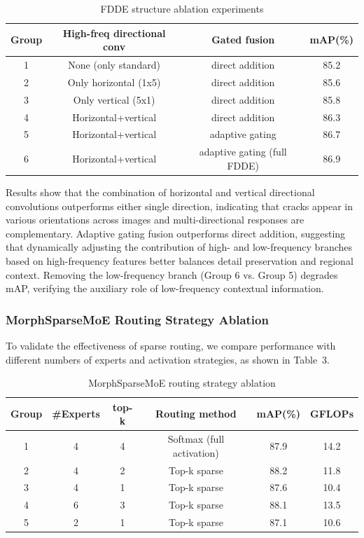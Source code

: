 \documentclass[twocolumn]{sn-jnl}
\begin{document}
	\begin{table}[htbp]
		\centering
		\caption{FDDE structure ablation experiments}
		\begin{tabular}{cccc}
			\toprule
			Group & High-freq directional conv & Gated fusion & mAP(\%) \\
			\midrule
			1 & None (only standard) & direct addition & 85.2 \\
			2 & Only horizontal (1x5) & direct addition & 85.6 \\
			3 & Only vertical (5x1) & direct addition & 85.8 \\
			4 & Horizontal+vertical & direct addition & 86.3 \\
			5 & Horizontal+vertical & adaptive gating & 86.7 \\
			6 & Horizontal+vertical & adaptive gating (full FDDE) & 86.9 \\
			\bottomrule
		\end{tabular}
		\label{tab:fdde}
	\end{table}
	
	Results show that the combination of horizontal and vertical directional convolutions outperforms either single direction, indicating that cracks appear in various orientations across images and multi-directional responses are complementary. Adaptive gating fusion outperforms direct addition, suggesting that dynamically adjusting the contribution of high- and low-frequency branches based on high-frequency features better balances detail preservation and regional context. Removing the low-frequency branch (Group 6 vs. Group 5) degrades mAP, verifying the auxiliary role of low-frequency contextual information.
	
	\subsubsection{MorphSparseMoE Routing Strategy Ablation}
	To validate the effectiveness of sparse routing, we compare performance with different numbers of experts and activation strategies, as shown in Table~3.
	
	\begin{table}[htbp]
		\centering
		\caption{MorphSparseMoE routing strategy ablation}
		\begin{tabular}{cccccc}
			\toprule
			Group & \#Experts & top-k & Routing method & mAP(\%) & GFLOPs \\
			\midrule
			1 & 4 & 4 & Softmax (full activation) & 87.9 & 14.2 \\
			2 & 4 & 2 & Top-k sparse & 88.2 & 11.8 \\
			3 & 4 & 1 & Top-k sparse & 87.6 & 10.4 \\
			4 & 6 & 3 & Top-k sparse & 88.1 & 13.5 \\
			5 & 2 & 1 & Top-k sparse & 87.1 & 10.6 \\
			\bottomrule
		\end{tabular}
		\label{tab:moe}
	\end{table}
	
\end{document}
